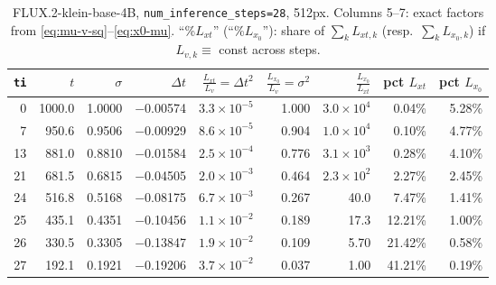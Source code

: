 \documentclass[11pt,a4paper]{article}
\newcommand{\dt}{\Delta t}
\begin{document}
\begin{table}[ht]
\centering
\footnotesize
\renewcommand{\arraystretch}{1.15}
\begin{tabular}{@{}rrrrrrrrr@{}}
\toprule
\texttt{ti} & $t$ & $\sigma$ & $\Delta t$
 & $\frac{L_{xt}}{L_v}=\dt^2$ & $\frac{L_{x_0}}{L_v}=\sigma^2$ & $\frac{L_{x_0}}{L_{xt}}$
 & pct $L_{xt}$ & pct $L_{x_0}$ \\
\midrule
 0 & 1000.0 & 1.0000 & $-$0.00574 & $3.3{\times}10^{-5}$ & 1.000 & $3.0{\times}10^{4}$ & 0.04\% & 5.28\% \\
 7 &  950.6 & 0.9506 & $-$0.00929 & $8.6{\times}10^{-5}$ & 0.904 & $1.0{\times}10^{4}$ & 0.10\% & 4.77\% \\
13 &  881.0 & 0.8810 & $-$0.01584 & $2.5{\times}10^{-4}$ & 0.776 & $3.1{\times}10^{3}$ & 0.28\% & 4.10\% \\
21 &  681.5 & 0.6815 & $-$0.04505 & $2.0{\times}10^{-3}$ & 0.464 & $2.3{\times}10^{2}$ & 2.27\% & 2.45\% \\
24 &  516.8 & 0.5168 & $-$0.08175 & $6.7{\times}10^{-3}$ & 0.267 & 40.0 & 7.47\% & 1.41\% \\
25 &  435.1 & 0.4351 & $-$0.10456 & $1.1{\times}10^{-2}$ & 0.189 & 17.3 & 12.21\% & 1.00\% \\
26 &  330.5 & 0.3305 & $-$0.13847 & $1.9{\times}10^{-2}$ & 0.109 & 5.70 & 21.42\% & 0.58\% \\
27 &  192.1 & 0.1921 & $-$0.19206 & $3.7{\times}10^{-2}$ & 0.037 & 1.00 & 41.21\% & 0.19\% \\
\bottomrule
\end{tabular}
\caption{FLUX.2-klein-base-4B, \texttt{num\_inference\_steps=28}, 512px. Columns 5--7:
exact factors from \eqref{eq:mu-v-sq}--\eqref{eq:x0-mu}. ``\%$L_{xt}$'' (``\%$L_{x_0}$''): share
of $\sum_k L_{xt,k}$ (resp.\ $\sum_k L_{x_0,k}$) if $L_{v,k}\equiv$ const across steps.}
\label{tab:klein28-summary}
\end{table}


\end{document}

